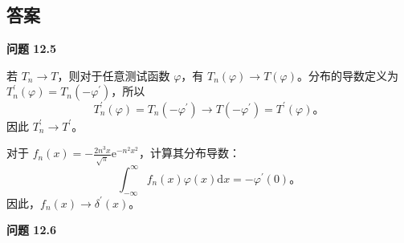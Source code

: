 \subsection{答案}\label{ux7b54ux6848}

\textbf{问题 12.5}

若 $T_n \to T$，则对于任意测试函数 $\varphi$，有
$T_n(\varphi) \to T(\varphi)$。分布的导数定义为
$T_n^{\prime}(\varphi) = T_n(-\varphi^{\prime})$，所以
 $$
T_n^{\prime}(\varphi) = T_n(-\varphi^{\prime}) \to T(-\varphi^{\prime}) = T^{\prime}(\varphi)。
$$
因此 $T_n^{\prime} \to T^{\prime}$。

对于
$f_n(x) = -\frac{2 n^3 x}{\sqrt{\pi}} \mathrm{e}^{-n^2 x^2}$，计算其分布导数：
 $$
\int_{-\infty}^\infty f_n(x) \varphi(x) \mathrm{d}x = -\varphi^{\prime}(0)。
$$
因此，$f_n(x) \to \delta^{\prime}(x)$。


\textbf{问题 12.6}


